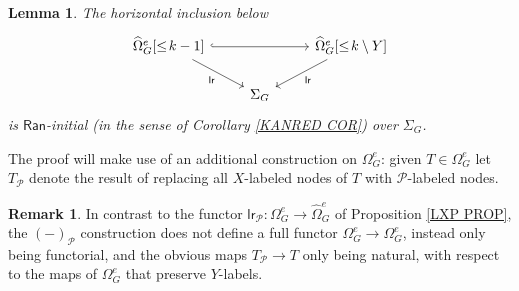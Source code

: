 \documentclass[a4paper,10pt
,draft
]{article}%
\numberwithin{equation}{section}
\numberwithin{figure}{section}
\newtheorem{lemma}[equation]{Lemma}%
\theoremstyle{definition} %
\newtheorem{remark}[equation]{Remark}%
\newcommand{\1}{\ensuremath{\mathbbm 1}}%
\begin{document}
\begin{lemma}\label{MINUS_LAN_FINAL_LEMMA}
% 
The horizontal inclusion below 
\[
\begin{tikzcd}
	\widehat{\Omega}_G^e[\leq\! k-1]
	\arrow{dr}[swap]{\mathsf{lr}} \arrow[rr, hookrightarrow] &&
	\widehat{\Omega}_G^{e}[\leq\! k \mathbin{\backslash} Y] \arrow{dl}{\mathsf{lr}}
\\
	&
	\Sigma_G
\end{tikzcd}
\]  
is $\mathsf{Ran}$-initial (in the sense of Corollary \ref{KANRED COR})
over $\Sigma_G$.  
\end{lemma}

The proof will make use of an additional construction on 
$\Omega_{G}^e$: given $T \in \Omega_{G}^e$ let $T_{\mathcal{P}}$ denote the result of replacing all $X$-labeled nodes of $T$ with $\mathcal{P}$-labeled nodes.

\begin{remark}\label{YINERT REM}
	In contrast to the functor
	$\mathsf{lr}_{\mathcal{P}} \colon
	\Omega_G^e \to \widehat{\Omega}_G^e $
	of Proposition \ref{LXP PROP},
	the $(\minus)_{\mathcal{P}}$ construction 
	does not define a full functor
        $\Omega_G^e \to \Omega_G^e$, instead only being functorial, and the obvious maps $T_{\mathcal{P}} \to T$ only being natural,
        with respect to the
        maps of $\Omega_G^e$ that preserve $Y$-labels.
\end{remark}
\end{document}
